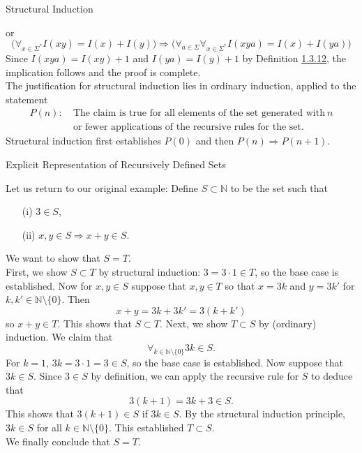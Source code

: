 \documentclass[smaller,hyperref={CJKbookmarks=true}]{beamer}
\newcommand{\N}{\mathbb{N}} \newcommand{\Z}{\mathbb{Z}} \newcommand{\Q}{\mathbb{Q}}
\begin{document}
\begin{frame}{Structural Induction}
\begin{spacing}{1.1}
or
\[\Big(\mathop{\forall}_{x\in\Sigma^*}I(xy)=I(x)+I(y)\Big)\Rightarrow
\Big(\mathop{\forall}_{a\in\Sigma}\mathop{\forall}_{x\in\Sigma^*}I(xya)=I(x)+I(ya)\Big)\]
Since $I(xya)=I(xy)+1$ and $I(ya)=I(y)+1$ by Definition \hyperlink{1.3.12}{1.3.12}, the implication follows and the proof is complete.\\[5pt]
The justification for structural induction lies in ordinary induction, applied
to the statement
\begin{align*}
  P(n)\!: &~\text{The claim is true for all elements of the set generated with}~n  \\
   &~\text{or fewer applications of the recursive rules for the set.}
\end{align*}
Structural induction first establishes $P(0)$ and then $P(n)\Rightarrow P(n+1)$.
\end{spacing}
\end{frame}
\begin{frame}{Explicit Representation of Recursively Defined Sets}
\begin{spacing}{1.1}
Let us return to our original example: Define $S\subset\N$ to be the set such that
\begin{itemize}
  \item[(i)] $3\in S$,
  \item[(ii)] $x,y\in S\Rightarrow x+y\in S$.
\end{itemize}
We want to show that $S=T$.\\[5pt]
First, we show $S\subset T$ by structural induction: $3=3\cdot1\in T$, so the base case is established. Now for $x,y\in S$ suppose that $x,y\in T$ so that $x=3k$ and $y=3k'$ for $k,k'\in\N\setminus\{0\}$. Then
\[x+y=3k+3k'=3(k+k')\]
so $x+y\in T$. This shows that $S\subset T$.
\newpage
Next, we show $T\subset S$ by (ordinary) induction. We claim that
\[\mathop{\forall}_{k\in\N\setminus\{0\}}3k\in S.\]
For $k=1,\,3k=3\cdot1=3\in S$, so the base case is established. Now suppose that $3k\in S$. Since $3\in S$ by definition, we can apply the recursive rule for $S$ to deduce that
\[3(k+1)=3k+3\in S.\]
This shows that $3(k+1)\in S$ if $3k\in S$. By the structural induction principle, $3k\in S$ for all $k\in\N\setminus\{0\}$. This established $T\subset S$.\\[6pt]
We finally conclude that $S=T$.
\end{spacing}
\end{frame}
\end{document}
